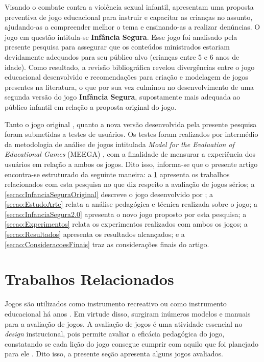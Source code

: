 \documentclass[alpha-refs,brazilian]{RBCA_v2.0}
\begin{document}
Visando o combate contra a violência sexual infantil, \cite{diocesano2018jogo} apresentam uma proposta preventiva de jogo educacional para instruir e capacitar as crianças no assunto, ajudando-as a compreender melhor o tema e ensinando-as a realizar denúncias. O jogo em questão intitula-se \textbf{Infância Segura}. Esse jogo foi analisado pela presente pesquisa para assegurar que os conteúdos ministrados estariam devidamente adequados para seu público alvo (crianças entre 5 e 6 anos de idade). Como resultado, a revisão bibliográfica revelou divergências entre o jogo educacional desenvolvido e recomendações para criação e modelagem de jogos presentes na literatura, o que por sua vez culminou no desenvolvimento de uma segunda versão do jogo \textbf{Infância Segura}, supostamente mais adequada ao público infantil em relação a proposta original do jogo. 

Tanto o jogo original \citep{diocesano2018jogo}, quanto a nova versão desenvolvida pela presente pesquisa foram submetidas a testes de usuários. Os testes foram realizados por intermédio da metodologia de análise de jogos intitulada \textit{Model for the Evaluation of Educational Games} (MEEGA) \citep{savi2011model}, com a finalidade de mensurar a experiência dos usuários em relação a ambos os jogos. Dito isso, informa-se que o presente artigo encontra-se estruturado da seguinte maneira: a \cref{secao:TrabalhosRelacionados} apresenta os trabalhos relacionados com esta pesquisa no que diz respeito a avaliação de jogos sérios; a \cref{secao:InfanciaSeguraOriginal} descreve o jogo desenvolvido por  \cite{diocesano2018jogo}; a \cref{secao:EstudoArte} relata a análise pedagógica e técnica realizada sobre o jogo; a \cref{secao:InfanciaSegura2.0} apresenta o novo jogo proposto por esta pesquisa; a \cref{secao:Experimentos} relata os experimentos realizados com ambos os jogos; a \cref{secao:Resultados} apresenta os resultados alcançados; e a
\cref{secao:ConsideracoesFinais} traz as considerações finais do artigo.


\section{Trabalhos Relacionados}\label{secao:TrabalhosRelacionados}

Jogos são utilizados como instrumento recreativo ou como instrumento educacional há anos \citep{clark1970serious}. Em virtude disso, surgiram inúmeros modelos e manuais para a avaliação de jogos. A avaliação de jogos é uma atividade essencial no \textit{design} instrucional, pois permite avaliar a eficácia pedagógica do jogo, constatando se  cada lição do jogo consegue cumprir com aquilo que foi planejado para ele \citep{montilva2002method, padron2007towards}. Dito isso, a presente seção apresenta alguns jogos avaliados. 
\end{document}
